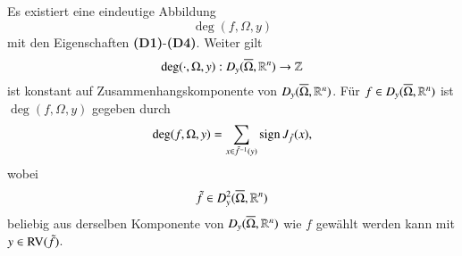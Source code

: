 \begin{theorem}\label{2.11}
    Es existiert eine eindeutige Abbildung
    \[\deg(f,\Omega,y)\]
    mit den Eigenschaften \textbf{(D1)}-\textbf{(D4)}. Weiter gilt
    \[
        \deg(\cdot, \Omega, y): D_y(\overline \Omega, \mathbb{R}^n)\rightarrow \mathbb{Z}
    \]
    ist konstant auf Zusammenhangskomponente von $D_y(\overline \Omega, \mathbb{R}^n)$. Für $f\in D_y(\overline \Omega,\mathbb{R}^n)$
    ist $\deg(f,\Omega,y)$ gegeben durch
    \[
        \deg(f,\Omega,y)=\sum_{x\in \tilde f ^{-1}(y)} \mathrm{sign}\, J_{\tilde f}(x),  
    \]
    wobei
    \[
        \tilde f \in D_y^2(\overline \Omega, \mathbb{R}^n)
    \]
    beliebig aus derselben Komponente von $D_y(\overline \Omega,\mathbb{R}^n)$ wie $f$ gewählt werden kann mit $y
    \in \mathrm{RV}(\tilde f)$.
\end{theorem}
